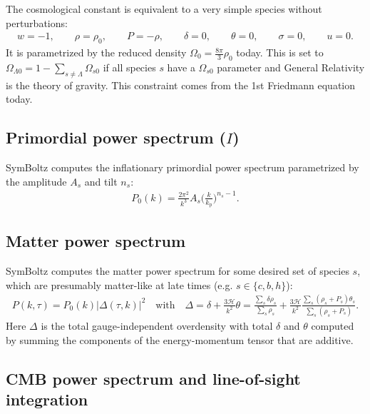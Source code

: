 \documentclass{aa}
\newcommand\scrH{\mathscr{H}}
\begin{document}
The cosmological constant is equivalent to a very simple species without perturbations:
\begin{align*}
    w = -1 , \qquad
    \rho = \rho_0, \qquad
    P = -\rho , \qquad
    \delta = 0 , \qquad
    \theta = 0 , \qquad
    \sigma = 0 , \qquad
    u = 0 .
\end{align*}
It is parametrized by the reduced density $\Omega_0 = \frac{8\pi}{3} \rho_0$ today.
This is set to $\Omega_{\Lambda 0} = 1 - \sum_{s \neq \Lambda} \Omega_{s0}$ if all species $s$ have a $\Omega_{s0}$ parameter and General Relativity is the theory of gravity.
This constraint comes from the 1st Friedmann equation today.

\subsection{Primordial power spectrum \texorpdfstring{($I$)}{(I)}}
\label{sec:primordial}

SymBoltz computes the inflationary primordial power spectrum parametrized by the amplitude $A_s$ and tilt $n_s$:
\begin{align*}
    P_0(k) = \frac{2\pi^2}{k^3} A_s \bigg(\frac{k}{k_\text{p}}\bigg)^{n_s-1}.
\end{align*}

\subsection{Matter power spectrum}
\label{sec:matter}

SymBoltz computes the matter power spectrum for some desired set of species $s$, which are presumably matter-like at late times (e.g. $s \in \{c,b,h\}$):
\begin{align*}
    P(k,\tau) = P_0(k) \big|\Delta(\tau,k)\big|^2
    \quad \text{with} \quad
    \Delta = \delta + \frac{3 \scrH}{k^2} \theta = \frac{\sum_s \delta\rho_s}{\sum_s \rho_s} + \frac{3 \scrH}{k^2} \frac{\sum_s (\rho_s+P_s)\theta_s}{\sum_s (\rho_s+P_s)} .
\end{align*}
Here $\Delta$ is the total gauge-independent overdensity with total $\delta$ and $\theta$ computed by summing the components of the energy-momentum tensor that are additive.


\subsection{CMB power spectrum and line-of-sight integration}
\end{document}
